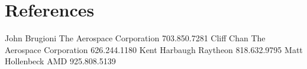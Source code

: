\section{References}

\begin{references}
        {John Brugioni}
        {The Aerospace Corporation}
        {703.850.7281}
        {Cliff Chan}
        {The Aerospace Corporation}
        {626.244.1180}
        {Kent Harbaugh}
        {Raytheon}
        {818.632.9795}
        {Matt Hollenbeck}
        {AMD}
        {925.808.5139}
\end{references}



